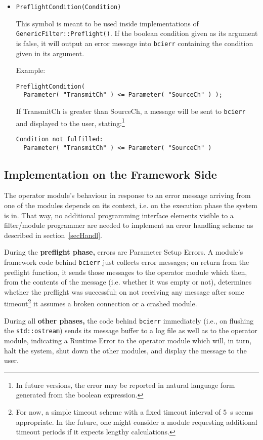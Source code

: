 \documentclass[12pt,letterpaper]{article}
\begin{document}
\begin{itemize}
\item \texttt{PreflightCondition(Condition)}

This symbol is meant to be used inside implementations of 
\texttt{GenericFilter::Preflight()}. If the boolean condition given as its
argument is false, it will output an error message into \texttt{bcierr} containing
the condition given in its argument.

Example:
\begin{verbatim}
PreflightCondition(
  Parameter( "TransmitCh" ) <= Parameter( "SourceCh" ) );
\end{verbatim}
If TransmitCh is greater than SourceCh, a message will be sent to \texttt{bcierr} and
displayed to the user, stating:\footnote{In future versions, the error may be reported
in natural language form generated from the boolean expression.}
\begin{verbatim}
Condition not fulfilled:
  Parameter( "TransmitCh" ) <= Parameter( "SourceCh" )
\end{verbatim}

\end{itemize}

\subsection{Implementation on the Framework Side}
\label{secImpl}

The operator module's behaviour in response to an error
message arriving from one of the modules depends
on its context, i.e. on the execution phase the system is in.
That way, no additional programming interface elements
visible to a filter/module programmer
are needed to implement an error handling scheme as
described in section~\ref{secHandl}. 

During the \textbf{preflight phase,} errors are {Parameter
Setup Errors.} A module's framework code behind
\texttt{bcierr} just collects error
messages; on return from the preflight function, it
sends those messages to the operator module which then,
from the contents of the message (i.e. whether it was empty
or not), determines whether the preflight was successful;
on not receiving any message after some timeout\footnote{
For now, a simple timeout scheme with a fixed timeout
interval of 5~s seems appropriate. In the future, one might consider
a module requesting additional timeout periods if it expects 
lengthy calculations.}
it assumes a broken connection or a crashed module.

During all \textbf{other phases,} the code behind \texttt{bcierr}
immediately (i.e., on flushing the \texttt{std::ostream})
sends its message buffer to a log file as well as to
the operator module, indicating a {Runtime Error} 
to the operator module which will, in turn, halt the system,
shut down the other modules, and display the message to the
user.
\end{document}
